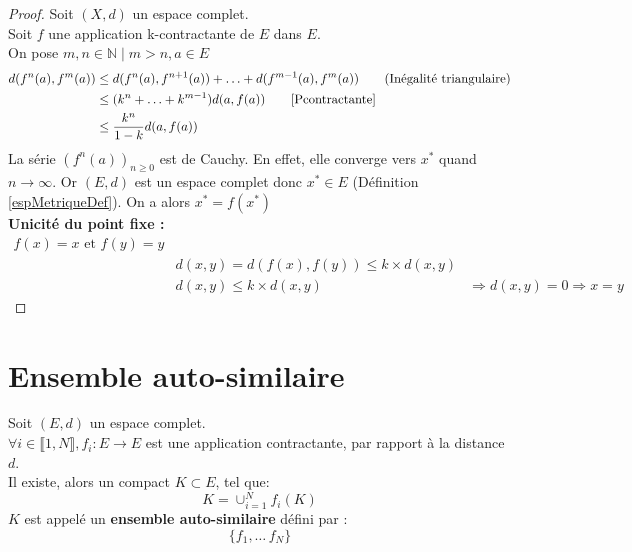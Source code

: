 \documentclass[a4paper, 12pt]{report}
\begin{document}
			\begin{proof}
				Soit $(X,d)$ un espace complet.\\
				Soit $f$ une application k-contractante de $E$ dans $E$.\\
				On pose $m,n\in\mathds{N}\mid m>n,a\in E$\\
				\begin{align*}
					d(f^n(a),f^m(a))&\leq d(f^n(a),f^{n+1}(a))+\ldots+d(f^{m-1}(a),f^m(a))  \tag{Inégalité triangulaire}\\
									&\leq (k^n+\ldots+k^{m-1})d(a,f(a)) \tag*{\eqref{Pcontractante}}\\
									&\leq \frac{k^n}{1-k}d(a,f(a))
				\end{align*}
				La série $(f^n(a))_{n\geq 0}$ est de Cauchy. En effet, elle converge vers $x^*$ quand $n\longrightarrow\infty$.
				Or $(E,d)$ est un espace complet donc $x^*\in E$ (Définition \ref{espMetriqueDef}).
				On a alors $x^*=f(x^*)$\\
				\textbf{Unicité du point fixe :}
				\begin{align*}
					f(x)=x \textrm{ et } f(y)=y\\
					&d(x,y) = d(f(x),f(y)) \leq k\times d(x,y)\\
					&d(x,y) \leq k\times d(x,y)
					&\Rightarrow d(x,y)=0\Rightarrow x=y \tag{Unicité}
				\end{align*}
			\end{proof}



		\section{Ensemble auto-similaire}
		
			\begin{theorem}
			\label{thmPrincipale}
				Soit $(E,d)$ un espace complet.\\
				$\forall i \in \llbracket 1,N \rrbracket, f_i:E \longrightarrow E$ est une application contractante, par rapport à la distance $d$.\\
				Il existe, alors un compact $K\subset E$, tel que:
				\begin{equation*}
					K=\cup^N_{i=1}f_i(K)
				\end{equation*}
				$K$ est appelé un \textbf{ensemble auto-similaire} défini par :
				\begin{equation*}
					\{f_1,\ldots\,f_N\}
				\end{equation*}
			\end{theorem}
		
\end{document}
